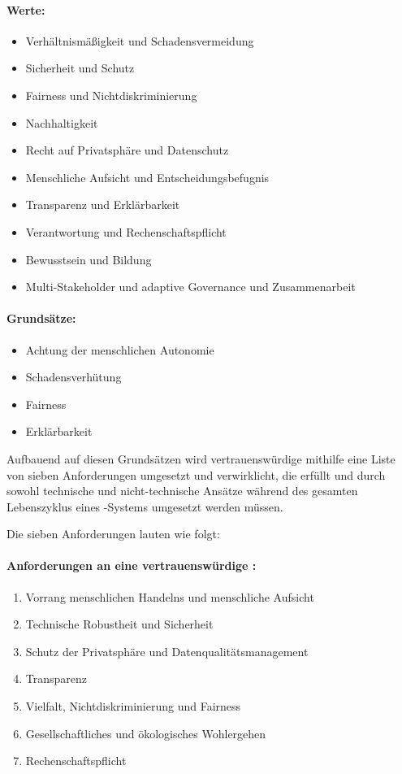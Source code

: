 \documentclass[hidelinks,12pt]{report}
\begin{document}
\paragraph{Werte:}
\begin{itemize}
	\item  Verhältnismäßigkeit und Schadensvermeidung
	\item  Sicherheit und Schutz
	\item  Fairness und Nichtdiskriminierung
	\item  Nachhaltigkeit
	\item  Recht auf Privatsphäre und Datenschutz
	\item  Menschliche Aufsicht und Entscheidungsbefugnis
	\item  Transparenz und Erklärbarkeit
	\item  Verantwortung und Rechenschaftspflicht
	\item  Bewusstsein und Bildung
	\item Multi-Stakeholder und adaptive Governance und Zusammenarbeit
\end{itemize}

\paragraph{Grundsätze:}
\begin{itemize}
	\item  Achtung der menschlichen Autonomie
	\item  Schadensverhütung
	\item  Fairness
	\item  Erklärbarkeit
\end{itemize}

Aufbauend auf diesen Grundsätzen wird vertrauenswürdige  mithilfe eine Liste von sieben Anforderungen umgesetzt und verwirklicht, die erfüllt und durch sowohl technische und nicht-technische Ansätze während des gesamten Lebenszyklus eines -Systems umgesetzt werden müssen.

Die sieben Anforderungen lauten wie folgt:

\paragraph{Anforderungen an eine vertrauenswürdige :}
\begin{enumerate}
	\item  Vorrang menschlichen Handelns und menschliche Aufsicht
	\item  Technische Robustheit und Sicherheit
	\item  Schutz der Privatsphäre und Datenqualitätsmanagement
	\item  Transparenz
	\item  Vielfalt, Nichtdiskriminierung und Fairness
	\item  Gesellschaftliches und ökologisches Wohlergehen
	\item  Rechenschaftspflicht
\end{enumerate}
\end{document}
